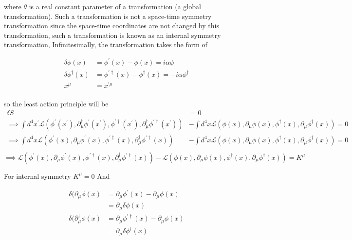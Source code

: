 \documentclass[12pt, letterpaper]{article}
\newcommand*{\1}{\hspace{1pt}}
\begin{document}
where $\theta$ is a real constant parameter of a transformation (a global transformation). Such a transformation is not a space-time symmetry transformation since the space-time coordinates are not changed by this transformation, such a transformation is known as an internal symmetry transformation, Infinitesimally, the transformation takes the form of 

\begin{align*}
    \delta \phi (x) &= \phi ^{\prime} (x) - \phi (x) = i \alpha \phi \\
    \delta \phi ^{\dagger} (x) &= \phi ^{\prime \dagger} (x) - \phi ^{\dagger} (x) = -i \alpha \phi ^{\dagger} \\ 
    x ^{\mu} &= x^{\prime \mu} \\ 
\end{align*}

so the least action principle will be
\begin{align*}
    \delta S &= 0\\
    \implies \int d ^{4} x^{\prime} \mathcal{L} (\phi ^{\prime} (x ^{\prime}), \partial ^{\dagger} _{\mu} \phi ^{\prime} (x^{\prime}), \phi ^{\prime \dagger} (x^{\prime}), \partial ^{\dagger} _{\mu}  \phi ^{\prime \dagger} (x^{\prime})) &-  \int d ^{4} x \mathcal{L} (\phi (x), \partial _{\mu} \phi  (x), \phi ^{ \dagger} (x), \partial _{\mu}  \phi ^{\dagger} (x)) = 0 \\
    \implies \int d ^{4} x \mathcal{L} (\phi ^{\prime} (x), \partial _{\mu} \phi ^{\prime} (x), \phi ^{\prime \dagger} (x), \partial ^{\dagger} _{\mu}  \phi ^{\prime \dagger} (x)) &-  \int d ^{4} x \mathcal{L} (\phi (x), \partial _{\mu} \phi  (x), \phi ^{ \dagger} (x), \partial _{\mu}  \phi ^{\dagger} (x)) = 0 \\ 
\end{align*}
\begin{equation}
    \implies \mathcal{L} (\phi ^{\prime} (x), \partial _{\mu} \phi ^{\prime} (x), \phi ^{\prime \dagger} (x), \partial ^{\dagger} _{\mu}  \phi ^{\prime \dagger} (x)) -  \mathcal{L} (\phi (x), \partial _{\mu} \phi  (x), \phi ^{ \dagger} (x), \partial _{\mu}  \phi ^{\dagger} (x)) = K ^{\mu} 
\end{equation}

For internal symmetry $K^{\mu} = 0 $ 
And

\begin{align*}
    \delta (\partial _{\mu} \phi(x) &= \partial _{\mu} \phi ^{\prime} (x) - \partial _{\mu} \phi (x) \\
    &= \partial _{\mu} \delta \phi (x) \\ 
    \delta (\partial ^{\dagger} _{\mu} \phi(x) &= \partial _{\mu} \phi ^{\prime \dagger} (x) - \partial _{\mu} \phi (x) \\
    &= \partial _{\mu} \delta \phi ^{\dagger} (x) \\ 
\end{align*}
\end{document}
